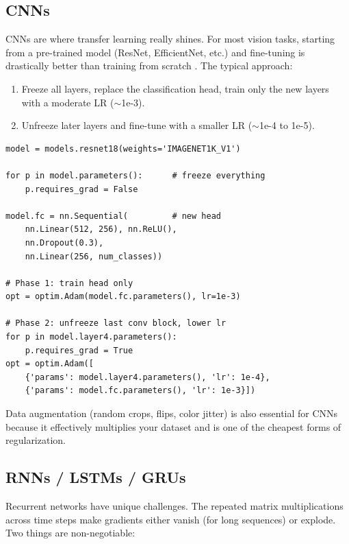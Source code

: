 \documentclass[12pt, letterpaper]{article}
\begin{document}
\subsection{CNNs}

CNNs are where transfer learning really shines. For most vision tasks, starting from a pre-trained model (ResNet, EfficientNet, etc.) and fine-tuning is drastically better than training from scratch \cite{he2019bag}. The typical approach:

\begin{enumerate}
    \item Freeze all layers, replace the classification head, train only the new layers with a moderate LR ($\sim$1e-3).
    \item Unfreeze later layers and fine-tune with a smaller LR ($\sim$1e-4 to 1e-5).
\end{enumerate}

\noindent\begin{minipage}{\linewidth}
\begin{lstlisting}[caption={Transfer learning with progressive unfreezing}]
model = models.resnet18(weights='IMAGENET1K_V1')

for p in model.parameters():      # freeze everything
    p.requires_grad = False

model.fc = nn.Sequential(         # new head
    nn.Linear(512, 256), nn.ReLU(),
    nn.Dropout(0.3),
    nn.Linear(256, num_classes))

# Phase 1: train head only
opt = optim.Adam(model.fc.parameters(), lr=1e-3)

# Phase 2: unfreeze last conv block, lower lr
for p in model.layer4.parameters():
    p.requires_grad = True
opt = optim.Adam([
    {'params': model.layer4.parameters(), 'lr': 1e-4},
    {'params': model.fc.parameters(), 'lr': 1e-3}])
\end{lstlisting}
\end{minipage}

Data augmentation (random crops, flips, color jitter) is also essential for CNNs because it effectively multiplies your dataset and is one of the cheapest forms of regularization.

\subsection{RNNs / LSTMs / GRUs}

Recurrent networks have unique challenges. The repeated matrix multiplications across time steps make gradients either vanish (for long sequences) or explode. Two things are non-negotiable:
\end{document}
